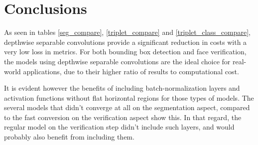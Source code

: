\documentclass[runningheads]{llncs}
\begin{document}
\begin{table}[]
\centering
\caption{Metrics comparison between the classification models}
\label{triplet_class_compare}
\end{table}



\section{Conclusions}

As seen in tables \ref{seg_compare}, \ref{triplet_compare} and \ref{triplet_class_compare}, depthwise separable convolutions provide a significant reduction in costs with a very low loss in metrics. For both bounding box detection and face verification, the models using depthwise separable convolutions are the ideal choice for real-world applications, due to their higher ratio of results to computational cost. 

It is evident however the benefits of including batch-normalization layers and activation functions without flat horizontal regions for those types of models. The several models that didn't converge at all on the segmentation aspect, compared to the fast conversion on the verification aspect show this. In that regard, the regular model on the verification step didn't include such layers, and would probably also benefit from including them. 
\end{document}
